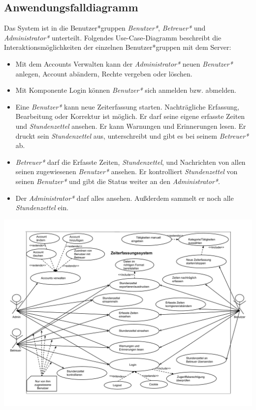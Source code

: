 \newpage
\subsection{Anwendungsfalldiagramm}
Das System ist in die Benutzer*gruppen \emph{Benutzer*}, \emph{Betreuer*} und \emph{Administrator*} unterteilt. Folgendes Use-Case-Diagramm beschreibt die Interaktionsmöglichkeiten der einzelnen Benutzer*gruppen mit dem Server:
\begin{itemize}
	\item Mit dem Accounts Verwalten kann der \emph{Administrator*} neuen \emph{Benutzer*} anlegen, Account abändern, Rechte vergeben oder löschen.
	\item Mit Komponente Login können \emph{Benutzer*} sich anmelden bzw. abmelden.
	\item Eine \emph{Benutzer*} kann neue Zeiterfassung starten. Nachträgliche Erfassung, Bearbeitung oder Korrektur ist möglich. Er darf seine eigene erfasste Zeiten und \emph{Stundenzettel} ansehen. Er kann Warnungen und Erinnerungen lesen. Er druckt sein \emph{Stundenzettel} aus, unterschreibt und gibt es bei seinem \emph{Betreuer*} ab.
	\item \emph{Betreuer*} darf die Erfasste Zeiten, \emph{Stundenzettel}, und Nachrichten von allen seinen zugewiesenen \emph{Benutzer*} ansehen. Er kontrolliert \emph{Stundenzettel} von seinen \emph{Benutzer*} und gibt die Status weiter an den \emph{Administrator*}.
	\item Der \emph{Administrator*} darf alles ansehen. Außderdem sammelt er noch alle \emph{Stundenzettel} ein.
\end{itemize}


\includegraphics[width=\linewidth]{Anwendungsfalldiagramm.pdf}\\
